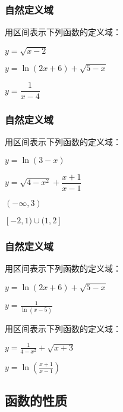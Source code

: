 \documentclass[14pt,notheorems,leqno,xcolor={rgb}]{beamer} %
\begin{document}
\begin{oframe}
\frametitle{自然定义域}
\begin{example}
用区间表示下列函数的定义域：
\begin{enumlite}
  \item $y = \sqrt{x-2}$
  \item $y= \ln(2x+6)+\sqrt{5-x}$
  \item $y = \dfrac{1}{x-4}$
\end{enumlite}
\end{example}
\end{oframe}

\begin{oframe}
\frametitle{自然定义域}
\begin{exercise}
用区间表示下列函数的定义域：
\begin{enumlite}
  \item $y=\ln(3-x)$
  \item $y=\sqrt{4-x^2}+\dfrac{x+1}{x-1}$
\end{enumlite}
\end{exercise}
\vpause
\begin{solution}
\begin{enumlite}
  \item $(-\infty,3)$
  \item $[-2,1)\cup(1,2]$
\end{enumlite}
\end{solution}
\end{oframe}

\begin{iframe}
\frametitle{自然定义域}
\begin{example}
用区间表示下列函数的定义域：
\begin{enumlite}
  \item $y= \ln(2x+6)+\sqrt{5-x}$
  \item $y= \frac{1}{\ln(x-5)}$
\end{enumlite}
\end{example}
\pause
\begin{exercise}
用区间表示下列函数的定义域：
\begin{enumlite}
  \item $y= \frac1{4-x^2}+\sqrt{x+3}$
  \item $y= \ln(\frac{x+1}{x-1})$
\end{enumlite}
\end{exercise}
\end{iframe}

\subsection{函数的性质}
\end{document}
